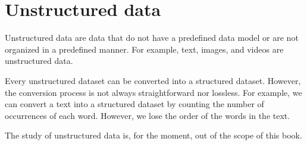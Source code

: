 \section{Unstructured data}

Unstructured data are data that do not have a predefined data model or are not organized
in a predefined manner.  For example, text, images, and videos are unstructured data.

Every unstructured dataset can be converted into a structured dataset.  However, the
conversion process is not always straightforward nor lossless.  For example, we can
convert a text into a structured dataset by counting the number of occurrences of each
word.  However, we lose the order of the words in the text.

The study of unstructured data is, for the moment, out of the scope of this book.
